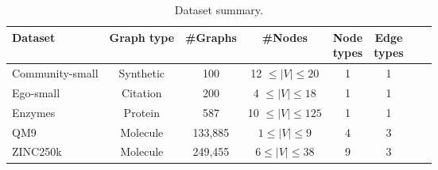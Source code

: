 \begin{table}[h!]
\centering
\caption{Dataset summary.}
\begin{tabular}{lccccccc}
\toprule
Dataset & 
Graph type & 
\#Graphs  & 
\#Nodes & 
\makecell{Node \\ types} & 
\makecell{Edge \\ types} \\
\midrule
Community-small &Synthetic  & 100       & 12 $\leq |V| \leq 20$   & 1 & 1\\
Ego-small       &Citation   & 200       & 4  $\leq |V| \leq 18$       & 1 & 1\\
Enzymes         &Protein    & 587       & 10 $\leq |V| \leq 125$      & 1 & 1\\
\midrule
QM9             &Molecule   & 133,885   & $1 \leq |V| \leq 9$        & 4 & 3 \\
ZINC250k        &Molecule   & 249,455   & $6 \leq |V| \leq 38$      & 9 & 3 \\
\bottomrule
\end{tabular}
\label{tab:data_summary}
\vspace{-1mm}
\end{table}



